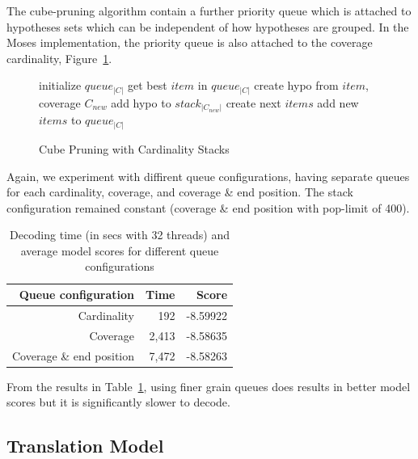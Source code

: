 \documentclass[11pt]{article}
\begin{document}
The cube-pruning algorithm contain a further priority queue which is attached to hypotheses sets which can be independent of how hypotheses are grouped. In the Moses implementation, the priority queue is also attached to the coverage cardinality, Figure~\ref{algo:Cube Pruning with Unsorted Stack}.
\begin{figure} [h]
\begin{algorithmic}
\STATE initialize $queue_{|C|}$
  \STATE get best $item$ in $queue_{|C|}$
  \STATE create hypo from $item$, coverage $C_{new}$
  \STATE add hypo to $stack_{|C_{new}|}$
  \STATE create next $items$
  \STATE add new $items$ to $queue_{|C|}$
\ENDFOR %
\end{algorithmic}
\caption{Cube Pruning with Cardinality Stacks}
\label{algo:Cube Pruning with Unsorted Stack}
\end{figure}
Again, we experiment with diffirent queue configurations, having separate queues for each cardinality, coverage, and coverage \& end position. The stack configuration remained constant (coverage \& end position with pop-limit of 400).
\begin{table}[h]
\small
\begin{center}
\begin{tabular}{|r|r|r|} \hline
Queue configuration		& Time		& Score \\ \hline
Cardinality			& 192		& -8.59922 \\
Coverage			& 2,413		& -8.58635 \\
Coverage \& end position	& 7,472		& -8.58263 \\ \hline
\end{tabular}
\end{center}
\caption{Decoding time (in secs with 32 threads) and average model scores for different queue configurations}
\label{tab:queue-configuration}
\end{table}
From the results in Table~\ref{tab:queue-configuration}, using finer grain queues does results in better model scores but it is significantly slower to decode.


\subsection{Translation Model}
\end{document}
